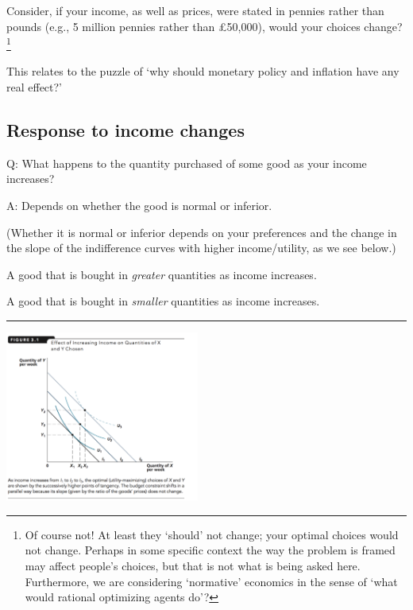 \documentclass[]{article}
\providecommand{\tightlist}{%
  \setlength{\itemsep}{0pt}\setlength{\parskip}{0pt}}
\begin{document}
Consider, if your income, as well as prices, were stated in pennies
rather than pounds (e.g., 5 million pennies rather than £50,000), would
your choices change?\footnote{Of course not! At least they `should' not
  change; your optimal choices would not change. Perhaps in some
  specific context the way the problem is framed may affect people's
  choices, but that is not what is being asked here. Furthermore, we are
  considering `normative' economics in the sense of `what would rational
  optimizing agents do'?}

This relates to the puzzle of `why should monetary policy and inflation
have any real effect?'

\hypertarget{response-to-income-changes}{%
\subsection{Response to income
changes}\label{response-to-income-changes}}

Q: What happens to the quantity purchased of some good as your income
increases?

A: Depends on whether the good is normal or inferior.

(Whether it is normal or inferior depends on your preferences and the
change in the slope of the indifference curves with higher
income/utility, as we see below.)

\bigskip

\begin{description}
\tightlist
\item[Normal good]
A good that is bought in \emph{greater} quantities as income increases.
\item[Inferior good]
A good that is bought in \emph{smaller} quantities as income increases.
\end{description}

\begin{center}\rule{0.5\linewidth}{\linethickness}\end{center}

\includegraphics[height=2.2in]{picsfigs/normalgood.png}
\end{document}

